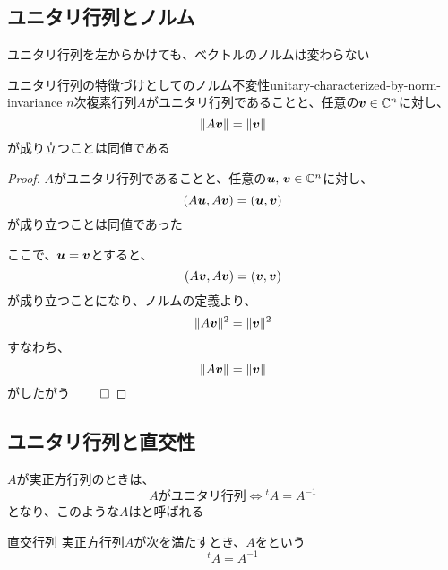 \documentclass[../../../topic_linear-algebra]{subfiles}
\begin{document}
\subsection{ユニタリ行列とノルム}

ユニタリ行列を左からかけても、ベクトルのノルムは変わらない

\begin{theorem}{ユニタリ行列の特徴づけとしてのノルム不変性}{unitary-characterized-by-norm-invariance}
  $n$次複素行列$A$がユニタリ行列であることと、任意の$\vb*{v} \in \mathbb{C}^n$に対し、
  \begin{equation*}
    \|A\vb*{v}\| = \|\vb*{v}\|
  \end{equation*}
  が成り立つことは同値である
\end{theorem}

\begin{proof}
  $A$がユニタリ行列であることと、任意の$\vb*{u},\,\vb*{v} \in \mathbb{C}^n$に対し、
  \begin{equation*}
    (A\vb*{u}, A\vb*{v}) = (\vb*{u}, \vb*{v})
  \end{equation*}
  が成り立つことは同値であった

  ここで、$\vb*{u} = \vb*{v}$とすると、
  \begin{equation*}
    (A\vb*{v}, A\vb*{v}) = (\vb*{v}, \vb*{v})
  \end{equation*}
  が成り立つことになり、ノルムの定義より、
  \begin{equation*}
    \|A\vb*{v}\|^2                 = \|\vb*{v}\|^2
  \end{equation*}
  すなわち、
  \begin{equation*}
    \|A\vb*{v}\| = \|\vb*{v}\|
  \end{equation*}
  がしたがう $\qed$
\end{proof}

\subsection{ユニタリ行列と直交性}

$A$が実正方行列のときは、
\begin{equation*}
  A\text{がユニタリ行列} \Longleftrightarrow {}^tA = A^{-1}
\end{equation*}
となり、このような$A$はと呼ばれる

\begin{definition}{直交行列}
  実正方行列$A$が次を満たすとき、$A$をという
  \begin{equation*}
    {}^t A = A^{-1}
  \end{equation*}
\end{definition}
\end{document}

